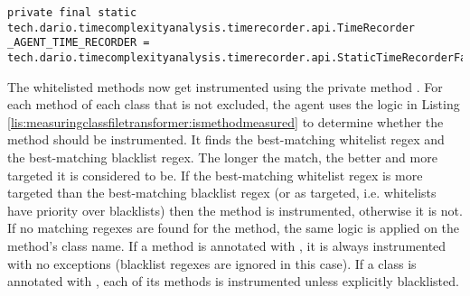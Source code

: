 \begin{lstlisting}[breaklines,caption={$\_AGENT\_TIME\_RECORDER$ initialization},label=lis:measuringclassfiletransformer:agenttimerecorder]
private final static tech.dario.timecomplexityanalysis.timerecorder.api.TimeRecorder _AGENT_TIME_RECORDER = tech.dario.timecomplexityanalysis.timerecorder.api.StaticTimeRecorderFactory.getTimeRecorder();
\end{lstlisting}

\noindent The whitelisted methods now get instrumented using the private method . For each method of each class that is not excluded, the agent uses the logic in Listing \ref{lis:measuringclassfiletransformer:ismethodmeasured} to determine whether the method should be instrumented. It finds the best-matching whitelist regex and the best-matching blacklist regex. The longer the match, the better and more targeted it is considered to be. If the best-matching whitelist regex is more targeted than the best-matching blacklist regex (or as targeted, i.e. whitelists have priority over blacklists) then the method is instrumented, otherwise it is not. If no matching regexes are found for the method, the same logic is applied on the method's class name. \noindent If a method is annotated with , it is always instrumented with no exceptions (blacklist regexes are ignored in this case). If a class is annotated with , each of its methods is instrumented unless explicitly blacklisted.

